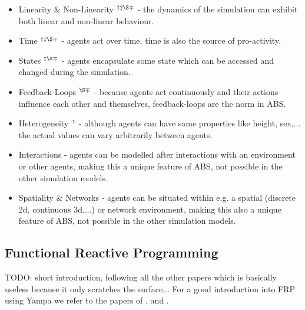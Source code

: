 \begin{itemize}
	\item Linearity \& Non-Linearity $^{\dag \ddag \S \mp}$ - the dynamics of the simulation can exhibit both linear and non-linear behaviour. 
	\item Time $^{\dag \ddag \S \mp}$ - agents act over time, time is also the source of pro-activity.
	\item States $^{\ddag \S \mp}$ - agents encapsulate some state which can be accessed and changed during the simulation.
	\item Feedback-Loops $^{\S \mp}$ - because agents act continuously and their actions influence each other and themselves, feedback-loops are the norm in ABS. 
	\item Heterogeneity $^{\mp}$ - although agents can have same properties like height, sex,... the actual values can vary arbitrarily between agents.
	\item Interactions - agents can be modelled after interactions with an environment or other agents, making this a unique feature of ABS, not possible in the other simulation models.
	\item Spatiality \& Networks - agents can be situated within e.g. a spatial (discrete 2d, continuous 3d,...) or network environment, making this also a unique feature of ABS, not possible in the other simulation models.
\end{itemize}

\subsection{Functional Reactive Programming}
TODO: short introduction, following all the other papers which is basically useless because it only scratches the surface...
For a good introduction into FRP using Yampa we refer to the papers of \cite{hudak_arrows_2003}, \cite{courtney_yampa_2003} and \cite{nilsson_functional_2002}.